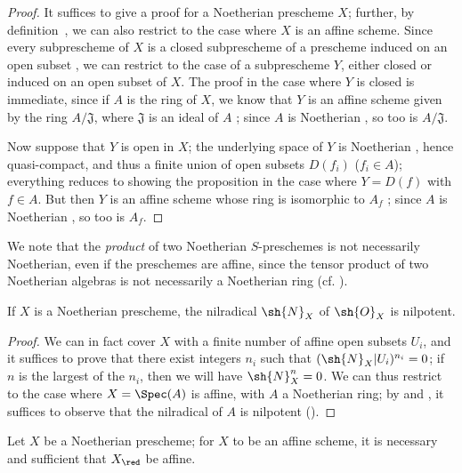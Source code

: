 \begin{proof}
It suffices to give a proof for a Noetherian prescheme $X$;
further, by definition~, we can also restrict to the case where $X$ is an affine scheme.
Since every subprescheme of $X$ is a closed subprescheme of a prescheme induced on an open subset , we can restrict to the case of a subprescheme $Y$, either closed or induced on an open subset of $X$.
The proof in the case where $Y$ is closed is immediate, since if $A$ is the ring of $X$, we know that $Y$ is an affine scheme given by the ring $A/\mathfrak{J}$, where $\mathfrak{J}$ is an ideal of $A$ ;
since $A$ is Noetherian , so too is $A/\mathfrak{J}$.

Now suppose that $Y$ is open in $X$;
the underlying space of $Y$ is Noetherian , hence quasi-compact, and thus a finite union of open subsets $D(f_i)$ ($f_i\in A$);
everything reduces to showing the proposition in the case where $Y=D(f)$ with $f\in A$.
But then $Y$ is an affine scheme whose ring is isomorphic to $A_f$ ;
since $A$ is Noetherian , so too is $A_f$.
\end{proof}

\begin{env}[6.1.5]
\label{I.6.1.5}
We note that the \emph{product} of two Noetherian $S$-preschemes is not necessarily Noetherian, even if the preschemes are affine, since the tensor product of two Noetherian algebras is not necessarily a Noetherian ring (cf. ).
\end{env}

\begin{proposition}[6.1.6]
\label{I.6.1.6}
If $X$ is a Noetherian prescheme, the nilradical $\sh{N}_X$ of $\sh{O}_X$ is nilpotent.
\end{proposition}

\begin{proof}
We can in fact cover $X$ with a finite number of affine open subsets $U_i$, and it suffices to prove that there exist integers $n_i$ such that $(\sh{N}_X|U_i)^{n_i}=0$;
if $n$ is the largest of the $n_i$, then we will have $\sh{N}_X^n=0$.
We can thus restrict to the case where $X=\Spec(A)$ is affine, with $A$ a Noetherian ring;
by  and , it suffices to observe that the nilradical of $A$ is nilpotent (\cite[p.~127, cor.~4]{I-11}).
\end{proof}

\begin{corollary}[6.1.7]
\label{I.6.1.7}
Let $X$ be a Noetherian prescheme;
for $X$ to be an affine scheme, it is necessary and sufficient that $X_\red$ be affine.
\end{corollary}

